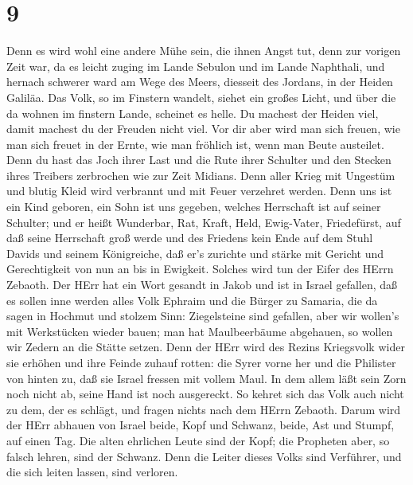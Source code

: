 \hypertarget{section-8}{%
\section{9}\label{section-8}}

 Denn es wird wohl eine andere Mühe sein, die ihnen Angst
tut, denn zur vorigen Zeit war, da es leicht zuging im Lande Sebulon und
im Lande Naphthali, und hernach schwerer ward am Wege des Meers,
diesseit des Jordans, in der Heiden Galiläa.  Das Volk, so
im Finstern wandelt, siehet ein großes Licht, und über die da wohnen im
finstern Lande, scheinet es helle.  Du machest der Heiden
viel, damit machest du der Freuden nicht viel. Vor dir aber wird man
sich freuen, wie man sich freuet in der Ernte, wie man fröhlich ist,
wenn man Beute austeilet.  Denn du hast das Joch ihrer Last
und die Rute ihrer Schulter und den Stecken ihres Treibers zerbrochen
wie zur Zeit Midians.  Denn aller Krieg mit Ungestüm und
blutig Kleid wird verbrannt und mit Feuer verzehret werden. 
Denn uns ist ein Kind geboren, ein Sohn ist uns gegeben, welches
Herrschaft ist auf seiner Schulter; und er heißt Wunderbar, Rat, Kraft,
Held, Ewig-Vater, Friedefürst,  auf daß seine Herrschaft
groß werde und des Friedens kein Ende auf dem Stuhl Davids und seinem
Königreiche, daß er's zurichte und stärke mit Gericht und Gerechtigkeit
von nun an bis in Ewigkeit. Solches wird tun der Eifer des HErrn
Zebaoth.  Der HErr hat ein Wort gesandt in Jakob und ist in
Israel gefallen,  daß es sollen inne werden alles Volk
Ephraim und die Bürger zu Samaria, die da sagen in Hochmut und stolzem
Sinn:  Ziegelsteine sind gefallen, aber wir wollen's mit
Werkstücken wieder bauen; man hat Maulbeerbäume abgehauen, so wollen wir
Zedern an die Stätte setzen.  Denn der HErr wird des Rezins
Kriegsvolk wider sie erhöhen und ihre Feinde zuhauf rotten:
 die Syrer vorne her und die Philister von hinten zu, daß
sie Israel fressen mit vollem Maul. In dem allem läßt sein Zorn noch
nicht ab, seine Hand ist noch ausgereckt.  So kehret sich
das Volk auch nicht zu dem, der es schlägt, und fragen nichts nach dem
HErrn Zebaoth.  Darum wird der HErr abhauen von Israel
beide, Kopf und Schwanz, beide, Ast und Stumpf, auf einen Tag.
 Die alten ehrlichen Leute sind der Kopf; die Propheten
aber, so falsch lehren, sind der Schwanz.  Denn die Leiter
dieses Volks sind Verführer, und die sich leiten lassen, sind verloren.
